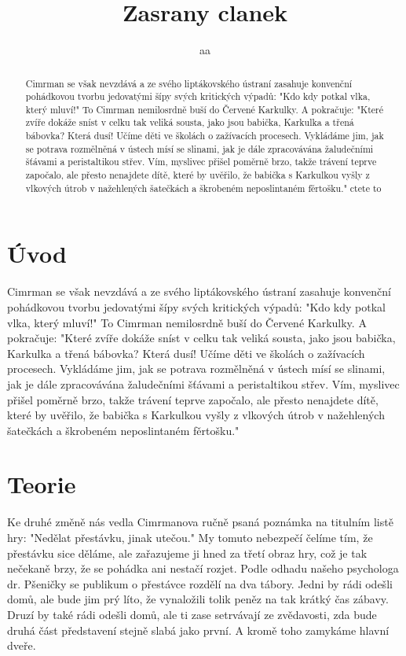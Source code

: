 \documentclass[11pt]{article}
\begin{document}
\title{Zasrany clanek}

\author{aa}
\maketitle
\begin{abstract}
	
	Cimrman se však nevzdává a ze svého liptákovského ústraní zasahuje konvenční pohádkovou tvorbu jedovatými šípy svých kritických výpadů: "Kdo kdy potkal vlka, který mluví!" To Cimrman nemilosrdně buší do Červené Karkulky. A pokračuje: "Které zvíře dokáže sníst v celku tak veliká sousta, jako jsou babička, Karkulka a třená bábovka? Která dusí! Učíme děti ve školách o zažívacích procesech. Vykládáme jim, jak se potrava rozmělněná v ústech mísí se slinami, jak je dále zpracovávána žaludečními šťávami a peristaltikou střev. Vím, myslivec přišel poměrně brzo, takže trávení teprve započalo, ale přesto nenajdete dítě, které by uvěřilo, že babička s Karkulkou vyšly z vlkových útrob v nažehlených šatečkách a škrobeném neposlintaném fěrtošku."
	ctete to
\end{abstract}

\section{Úvod}
Cimrman se však nevzdává a ze svého liptákovského ústraní zasahuje konvenční pohádkovou tvorbu jedovatými šípy svých kritických výpadů: "Kdo kdy potkal vlka, který mluví!" To Cimrman nemilosrdně buší do Červené Karkulky. A pokračuje: "Které zvíře dokáže sníst v celku tak veliká sousta, jako jsou babička, Karkulka a třená bábovka? Která dusí! Učíme děti ve školách o zažívacích procesech. Vykládáme jim, jak se potrava rozmělněná v ústech mísí se slinami, jak je dále zpracovávána žaludečními šťávami a peristaltikou střev. Vím, myslivec přišel poměrně brzo, takže trávení teprve započalo, ale přesto nenajdete dítě, které by uvěřilo, že babička s Karkulkou vyšly z vlkových útrob v nažehlených šatečkách a škrobeném neposlintaném fěrtošku."
\section{Teorie}
Ke druhé změně nás vedla Cimrmanova ručně psaná poznámka na titulním listě hry: "Nedělat přestávku, jinak utečou." My tomuto nebezpečí čelíme tím, že přestávku sice děláme, ale zařazujeme ji hned za třetí obraz hry, což je tak nečekaně brzy, že se pohádka ani nestačí rozjet. Podle odhadu našeho psychologa dr. Pšeničky se publikum o přestávce rozdělí na dva tábory. Jedni by rádi odešli domů, ale bude jim prý líto, že vynaložili tolik peněz na tak krátký čas zábavy. Druzí by také rádi odešli domů, ale ti zase setrvávají ze zvědavosti, zda bude druhá část představení stejně slabá jako první. A kromě toho zamykáme hlavní dveře.
\end{document}
